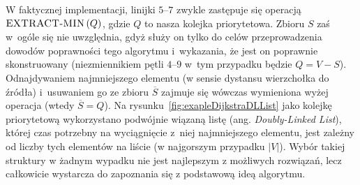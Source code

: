W faktycznej implementacji, linijki $5$--$7$ zwykle zastępuje się operacją $\textrm{\textsc{EXTRACT-MIN}} \left( Q \right)$, gdzie $Q$ to nasza kolejka priorytetowa.
Zbioru $S$ zaś w~ogóle się nie uwzględnia, gdyż służy on tylko do celów przeprowadzenia dowodów poprawności tego algorytmu i~wykazania, że jest on poprawnie skonstruowany (niezmiennikiem pętli $4$--$9$ w~tym przypadku będzie $Q = V - S$).
Odnajdywaniem najmniejszego elementu (w sensie dystansu wierzchołka do źródła) i~usuwaniem go ze zbioru $\overline{S}$ zajmuje się wówczas wymieniona wyżej operacja (wtedy $\overline{S} = Q$).
Na rysunku~\ref{fig:exapleDijkstraDLList} jako kolejkę priorytetową wykorzystano podwójnie wiązaną listę (ang. \textit{Doubly-Linked List}), której czas potrzebny na wyciągnięcie z~niej najmniejszego elementu, jest zależny od liczby tych elementów na liście (w najgorszym przypadku $ \left| V \right| $). Wybór takiej struktury w żadnym wypadku nie jest najlepszym z możliwych rozwiązań, lecz całkowicie wystarcza do zapoznania się z podstawową ideą algorytmu.

